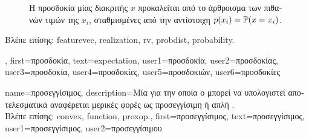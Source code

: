 {{\begin{figure}[H]
			{
			\caption{\foreignlanguage{greek}{Η προσδοκία μίας διακριτής}  $x$ \foreignlanguage{greek}{προκαλείται από το 
			άρθροισμα των πιθανών τιμών της $x_{i}$, σταθμισμένες από την αντίστοιχη}  $p(x_i) = \mathbb{P}({x= x_i})$. 
			\label{fig_expect_discrete_dict}} }
 		\end{figure}
		\foreignlanguage{greek}{Βλέπε επίσης:} \gls{featurevec}, \gls{realization}, \gls{rv}, \gls{probdist}, \gls{probability}.},
 	first={\foreignlanguage{greek}{προσδοκία}},
 	text={expectation},
	user1={\foreignlanguage{greek}{προσδοκία}}, %
 	user2={\foreignlanguage{greek}{προσδοκίας}}, %
 	user3={\foreignlanguage{greek}{προσδοκία}}, %
	user4={\foreignlanguage{greek}{προσδοκίες}}, %
 	user5={\foreignlanguage{greek}{προσδοκιών}}, %
 	user6={\foreignlanguage{greek}{προσδοκίες}} %
}

{name={\foreignlanguage{greek}{προσεγγίσιμος}},
	description={\foreignlanguage{greek}{Μία} 
		  \foreignlanguage{greek}{για την οποία ο}  
		\foreignlanguage{greek}{μπορεί να υπολογιστεί αποτελεσματικά αναφέρεται μερικές φορές ως 
		προσεγγίσιμη ή απλή} \cite{Condat2013}.\\
		\foreignlanguage{greek}{Βλέπε επίσης:} \gls{convex}, \gls{function}, \gls{proxop}.},
	first={\foreignlanguage{greek}{προσεγγίσιμος}},
	text={\foreignlanguage{greek}{προσεγγίσιμος}},
	user1={\foreignlanguage{greek}{προσεγγίσιμος}}, %
	user2={\foreignlanguage{greek}{προσεγγίσιμου}} %
}

